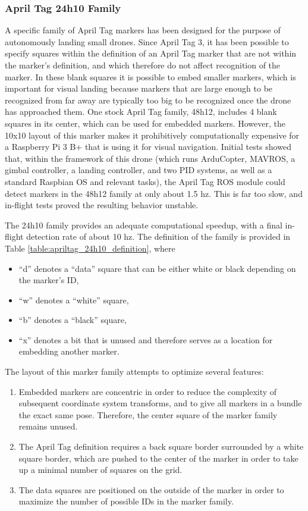 \subsubsection{April Tag 24h10 Family}

A specific family of April Tag markers has been designed for the purpose of autonomously landing small drones.
Since April Tag 3, it has been possible to specify squares within the definition of an April Tag marker that are not
within the marker's definition, and which therefore do not affect recognition of the marker.
In these blank squares it is possible to embed smaller markers, which is important for visual landing because markers
that are large enough to be recognized from far away are typically too big to be recognized once the drone has approached them.
One stock April Tag family, 48h12, includes 4 blank squares in its center, which can be used for embedded markers.
However, the 10x10 layout of this marker makes it prohibitively computationally expensive for a Raspberry Pi 3 B+
that is using it for visual navigation.
Initial tests showed that, within the framework of this drone (which runs ArduCopter, MAVROS, a gimbal controller, a landing controller, and two PID systems, as well as a standard Raspbian OS and relevant tasks),
the April Tag ROS module could detect markers in the 48h12 family at only about 1.5 hz.
This is far too slow, and in-flight tests proved the resulting behavior unstable.

The 24h10 family provides an adequate computational speedup, with a final in-flight detection rate of about 10 hz.
The definition of the family is provided in Table \ref{table:apriltag_24h10_definition}, where
\begin{itemize}
    \item ``d'' denotes a ``data'' square that can be either white or black depending on the marker's ID,
    \item ``w'' denotes a ``white'' square,
    \item ``b'' denotes a ``black'' square,
    \item ``x'' denotes a bit that is unused and therefore serves as a location for embedding another marker.
\end{itemize}

The layout of this marker family attempts to optimize several features:
\begin{enumerate}
    \item Embedded markers are concentric in order to reduce the complexity of subsequent coordinate system transforms,
          and to give all markers in a bundle the exact same pose.
          Therefore, the center square of the marker family remains unused.
    \item The April Tag definition requires a back square border surrounded by a white square border, which are pushed
          to the center of the marker in order to take up a minimal number of squares on the grid.
    \item The data squares are positioned on the outside of the marker in order to maximize the number of possible IDs
          in the marker family.
\end{enumerate}

